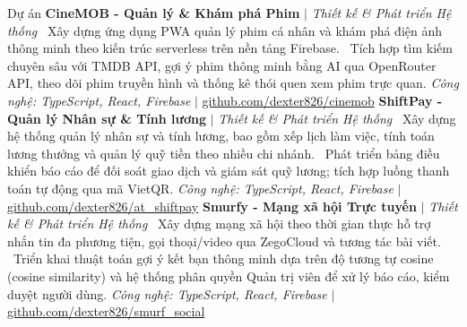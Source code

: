 \begin{rubric}{Dự án}
\entry*[]%
    \textbf{CineMOB - Quản lý \& Khám phá Phim} $|$ \textit{Thiết kế \& Phát triển Hệ thống}
    \newline\textbullet\ Xây dựng ứng dụng PWA quản lý phim cá nhân và khám phá điện ảnh thông minh theo kiến trúc serverless trên nền tảng Firebase.
    \newline\textbullet\ Tích hợp tìm kiếm chuyên sâu với TMDB API, gợi ý phim thông minh bằng AI qua OpenRouter API, theo dõi phim truyền hình và thống kê thói quen xem phim trực quan.
    \newline\textit{\small Công nghệ: TypeScript, React, Firebase} $|$ \href{https://github.com/dexter826/cinemob}{\small github.com/dexter826/cinemob}
\entry*[]%
    \textbf{ShiftPay - Quản lý Nhân sự \& Tính lương} $|$ \textit{Thiết kế \& Phát triển Hệ thống}
    \newline\textbullet\ Xây dựng hệ thống quản lý nhân sự và tính lương, bao gồm xếp lịch làm việc, tính toán lương thưởng và quản lý quỹ tiền theo nhiều chi nhánh.
    \newline\textbullet\ Phát triển bảng điều khiển báo cáo để đối soát giao dịch và giám sát quỹ lương; tích hợp luồng thanh toán tự động qua mã VietQR.
    \newline\textit{\small Công nghệ: TypeScript, React, Firebase} $|$ \href{https://github.com/dexter826/at_shiftpay}{\small github.com/dexter826/at\_shiftpay}
\entry*[]%
    \textbf{Smurfy - Mạng xã hội Trực tuyến} $|$ \textit{Thiết kế \& Phát triển Hệ thống}
    \newline\textbullet\ Xây dựng mạng xã hội theo thời gian thực hỗ trợ nhắn tin đa phương tiện, gọi thoại/video qua ZegoCloud và tương tác bài viết.
    \newline\textbullet\ Triển khai thuật toán gợi ý kết bạn thông minh dựa trên độ tương tự cosine (cosine similarity) và hệ thống phân quyền Quản trị viên để xử lý báo cáo, kiểm duyệt người dùng.
    \newline\textit{\small Công nghệ: TypeScript, React, Firebase} $|$ \href{https://github.com/dexter826/smurf_social}{\small github.com/dexter826/smurf\_social}
\end{rubric}
